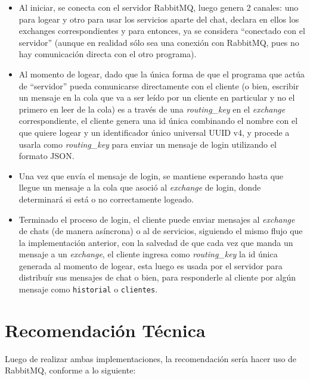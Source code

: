 \documentclass[11pt, letter]{article}
\begin{document}
\begin{itemize}
	\item Al iniciar, se conecta con el servidor RabbitMQ, luego genera 2 canales: uno para logear y otro para usar los servicios aparte del chat, declara en ellos los exchanges correspondientes y para entonces, ya se considera ``conectado con el servidor'' (aunque en realidad sólo sea una conexión con RabbitMQ, pues no hay comunicación directa con el otro programa).
	\item Al momento de logear, dado que la única forma de que el programa que actúa de ``servidor'' pueda comunicarse directamente con el cliente (o bien, escribir un mensaje en la cola que va a ser leído por un cliente en particular y no el primero en leer de la cola) es a través de una \textit{routing\_key} en el \textit{exchange} correspondiente, el cliente genera una id única combinando el nombre con el que quiere logear y un identificador único universal UUID v4\cite{RFC4122}, y procede a usarla como \textit{routing\_key} para enviar un mensaje de login utilizando el formato JSON\cite{RFC8259}.
	\item Una vez que envía el mensaje de login, se mantiene esperando hasta que llegue un mensaje a la cola que asoció al \textit{exchange} de login, donde determinará si está o no correctamente logeado.
	\item Terminado el proceso de login, el cliente puede enviar mensajes al \textit{exchange} de chats (de manera asíncrona) o al de servicios, siguiendo el mismo flujo que la implementación anterior, con la salvedad de que cada vez que manda un mensaje a un \textit{exchange}, el cliente ingresa como \textit{routing\_key} la id única generada al momento de logear, esta luego es usada por el servidor para distribuír sus mensajes de chat o bien, para responderle al cliente por algún mensaje como \texttt{historial} o \texttt{clientes}.
\end{itemize}

\section{Recomendación Técnica}

Luego de realizar ambas implementaciones, la recomendación sería hacer uso de RabbitMQ, conforme a lo siguiente:
\end{document}
